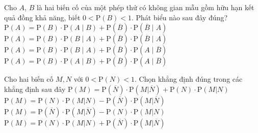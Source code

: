\begin{ex}%
	Cho $A$, $B$ là hai biến cố của một phép thử có không gian mẫu gồm hữu hạn kết  quả đồng khả năng, biết $0<\mathrm{P}(B)<1$. Phát biểu nào sau đây đúng?
	 \choice
		{$\mathrm{P}(A)=\mathrm{P}(B)\cdot  \mathrm{P}(A\mid B)+\mathrm{P}\left(\overline{B}\right)\cdot \mathrm{P}\left(\overline{B}\mid A\right)$}
		{$\mathrm{P}(A)=\mathrm{P}(B)\cdot \mathrm{P}(B\mid A)+\mathrm{P}\left(\overline{B}\right)\cdot  \mathrm{P}\left(\overline{B}\mid A\right)$}
		{$\mathrm{P}(A)=\mathrm{P}(B)\cdot  \mathrm{P}(B\mid A)+\mathrm{P}\left(\overline{B}\right)\cdot \mathrm{P}\left(A\mid\overline{B}\right)$}
		{\True $\mathrm{P}(A)=\mathrm{P}(B)\cdot \mathrm{P}(A\mid  B)+\mathrm{P}\left(\overline{B}\right)\cdot \mathrm{P}\left(A\mid\overline{B}\right)$}
\end{ex}

\begin{ex}%
	Cho hai biến cố $M, N$ với $0 < \mathrm{P}(N) < 1$. Chọn khẳng định đúng trong các khẳng định sau  đây
	\choice 
		{\True $\mathrm{P}(M) = \mathrm{P}(\overline{N})\cdot\mathrm{P}(M|\overline{N}) + \mathrm{P}(N)\cdot\mathrm{P}(M|N)$} 
		 {$\mathrm{P}(M) = \mathrm{P}(N)\cdot\mathrm{P}(M|N) - \mathrm{P}(\overline{N})\cdot\mathrm{P}(M|\overline{N})$}
		{$\mathrm{P}(M)  = \mathrm{P}(\overline{N})\cdot\mathrm{P}(M|\overline{N}) - \mathrm{P}(N)\cdot\mathrm{P}(M|N)$}
		{$\mathrm{P}(M) = \mathrm{P}(N)\cdot\mathrm{P}(M|N) + \mathrm{P}(\overline{N})\cdot\mathrm{P}(M|\overline{N})$} 
\end{ex}


